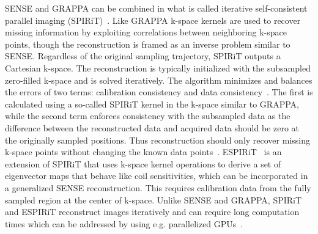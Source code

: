 SENSE and GRAPPA can be combined in what is called iterative self-consistent parallel imaging (SPIRiT)~\cite{SPIRiT}. Like GRAPPA k-space kernels are used to recover missing information by exploiting correlations between neighboring k-space points, though the reconstruction is framed as an inverse problem similar to SENSE. Regardless of the original sampling trajectory, SPIRiT outputs a Cartesian k-space. The reconstruction is typically initialized with the subsampled zero-filled k-space and is solved iteratively. The algorithm minimizes and balances the errors of two terms: calibration consistency and data consistency~\cite{AdvancesPI}. The first is calculated using a so-called SPIRiT kernel in the k-space similar to GRAPPA, while the second term enforces consistency with the subsampled data as the difference between the reconstructed data and acquired data should be zero at the originally sampled positions. Thus reconstruction should only recover missing k-space points without changing the known data points~\cite{AdvancesPI}. %
ESPIRiT~\cite{ESPIRiT} is an extension of SPIRiT that uses k-space kernel operations to derive a set of eigenvector maps that behave like coil sensitivities, which can be incorporated in a generalized SENSE reconstruction. This requires calibration data from the fully sampled region at the center of k-space. Unlike SENSE and GRAPPA, SPIRiT and ESPIRiT reconstruct images iteratively and can require long computation times which can be addressed by using e.g. parallelized GPUs~\cite{AdvancesPI}.

